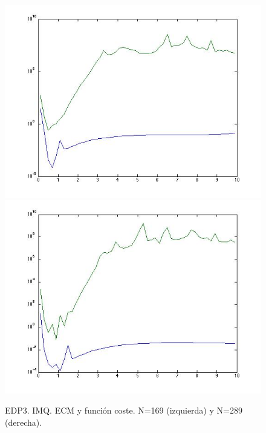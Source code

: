 \documentclass[11pt,a4paper]{article}
\begin{document}
 \begin{figure}
\includegraphics[scale=.4]{edp3_169_imq.jpg}
\includegraphics[scale=.4]{edp3_289_imq.jpg}
\caption{EDP3. IMQ. ECM y función coste. N=169 (izquierda) y N=289 (derecha).}
\end{figure}
\end{document}
